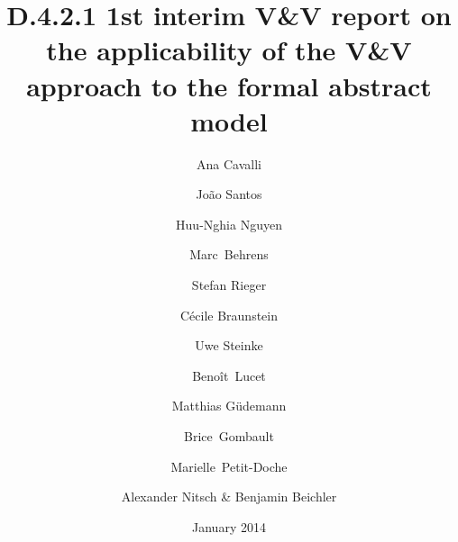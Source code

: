 \documentclass{template/openetcs_article}
\begin{document}
\frontmatter
{}




\title{D.4.2.1 1st interim V\&V report on the applicability of the V\&V approach to the formal abstract model}

\subtitle{}

\date{January 2014}

\author{Ana Cavalli \and João Santos \and Huu-Nghia Nguyen}


\author{Marc~Behrens}


  
\author{Stefan Rieger}


\author{Cécile Braunstein}
  
\author{Uwe Steinke}

\author{Benoît~Lucet \and Matthias Güdemann \and Brice~Gombault \and Marielle~Petit-Doche} 


\author{Alexander Nitsch \& Benjamin Beichler}

  

\reporttype{}






\maketitle \tableofcontents \listoffiguresandtables \newpage
\end{document}
